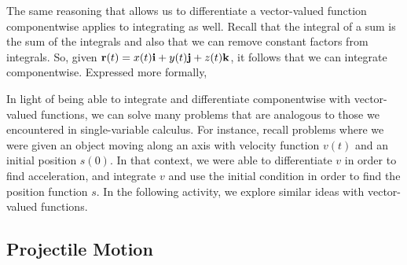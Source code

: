 \vspace*{5pt} \nin {} \vspace*{5pt}

The same reasoning that allows us to differentiate a vector-valued
function componentwise applies to integrating as well. Recall that the
integral of a sum is the sum of the integrals and also that we can
remove constant factors from integrals. So, given ${\mathbf{r}(t) = x(t) \mathbf{i}
+ y(t) \mathbf{j} + z(t) \mathbf{k}}$, it follows that we can integrate
componentwise. Expressed more formally,

\vspace*{5pt} \nin {} \vspace*{5pt}

%

In light of being able to integrate and differentiate componentwise
with vector-valued functions, we can solve many problems that are
analogous to those we encountered in single-variable calculus.  For
instance, recall problems where we were given an object moving along
an axis with velocity function $v(t)$ and an initial position $s(0)$.
In that context, we were able to differentiate $v$ in order to find
acceleration, and integrate $v$ and use the initial condition in order
to find the position function $s$.  In the following activity, we
explore similar ideas with vector-valued functions.




\subsection*{Projectile Motion}

